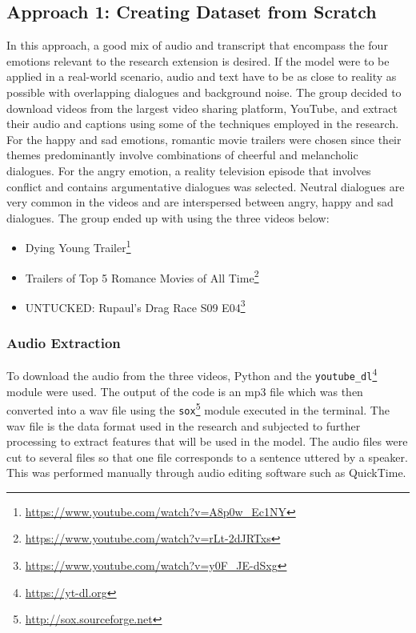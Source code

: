 \documentclass{article}
\newenvironment{subs}
  {\adjustwidth{3em}{0pt}}
  {\endadjustwidth}
\begin{document}
\begin{subs}
\subsection{Approach 1: Creating Dataset from Scratch}
In this approach, a good mix of audio and transcript that encompass the four emotions relevant to the research extension is desired. If the model were to be applied in a real-world scenario, audio and text have to be as close to reality as possible with overlapping dialogues and background noise. The group decided to download videos from the largest video sharing platform, YouTube, and extract their audio and captions using some of the techniques employed in the research. For the happy and sad emotions, romantic movie trailers were chosen since their themes predominantly involve combinations of cheerful and melancholic dialogues. For the angry emotion, a reality television episode that involves conflict and contains argumentative dialogues was selected. Neutral dialogues are very common in the videos and are interspersed between angry, happy and sad dialogues. The group ended up with using the three videos below:

\begin{itemize}
    \item Dying Young Trailer\footnote{\url{https://www.youtube.com/watch?v=A8p0w_Ec1NY}}
    \item Trailers of Top 5 Romance Movies of All Time\footnote{\url{https://www.youtube.com/watch?v=rLt-2dJRTxs}}
    \item UNTUCKED: Rupaul's Drag Race S09 E04\footnote{\url{https://www.youtube.com/watch?v=y0F_JE-dSxg}}
\end{itemize}
\end{subs}

\begin{subs}
\subsubsection*{Audio Extraction}
To download the audio from the three videos, Python and the \verb|youtube_dl|\footnote{\url{https://yt-dl.org}} module were used. The output of the code is an mp3 file which was then converted into a wav file using the \verb|sox|\footnote{\url{http://sox.sourceforge.net}} module executed in the terminal. The wav file is the data format used in the research and subjected to further processing to extract features that will be used in the model. The audio files were cut to several files so that one file corresponds to a sentence uttered by a speaker. This was performed manually through audio editing software such as QuickTime.
\end{subs}
\end{document}
